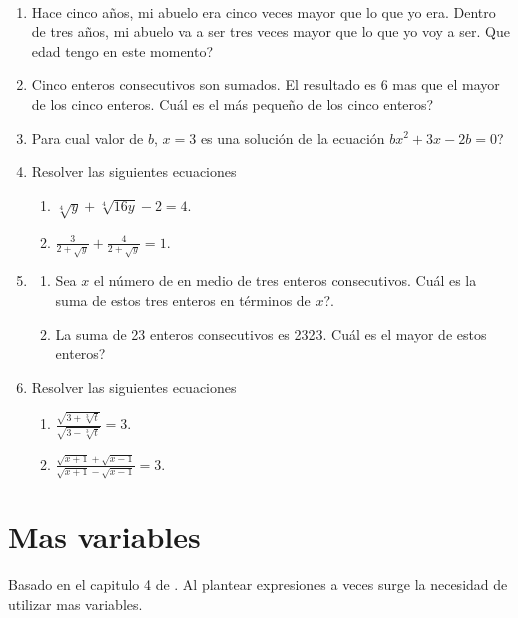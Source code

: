 \begin{exers}{\ \\}
\begin{enumerate}
\item Hace cinco años, mi abuelo era cinco veces mayor que lo que yo era. Dentro de tres años, mi abuelo va a ser tres veces mayor que lo que yo voy a ser. Que edad tengo en este momento?

\item Cinco enteros consecutivos son sumados. El resultado es 6 mas que el mayor de los cinco enteros. Cuál es el más pequeño de los cinco enteros?

\item Para cual valor de $b$, $x=3$ es una solución de la ecuación $bx^2+3x-2b=0$?

\item Resolver las siguientes ecuaciones	
		\begin{multicols}{2}
			\begin{enumerate}[label=\Alph*)]
				\item $\sqrt[4]{y} + \sqrt[4]{16y}-2=4$.
				\item $\frac{3}{2+\sqrt{y}} + \frac{4}{2+\sqrt{y}} = 1$.
			\end{enumerate}
		\end{multicols}
	
\item \hspace{1cm}	
	\begin{enumerate}[label=\Alph*)]
		\item Sea $x$ el número de en medio de tres enteros consecutivos. Cuál es la suma de estos tres enteros en términos de $x$?.
		\item La suma de 23 enteros consecutivos es 2323. Cuál es el mayor de estos enteros?
	\end{enumerate}

\item Resolver las siguientes ecuaciones	
		\begin{multicols}{2}
			\begin{enumerate}[label=\Alph*)]
				\item $\frac{\sqrt{3+\sqrt[3]{t}}}{\sqrt{3-\sqrt[3]{t}}} = 3$.
				\item $\frac{\sqrt{x+1}+\sqrt{x-1}}{\sqrt{x+1}-\sqrt{x-1}} = 3$.
			\end{enumerate}
		\end{multicols}
\end{enumerate}
\end{exers}
\newpage


\chapter{Mas variables}\label{Capitulo_mas_variables}
Basado en el capitulo 4 de \cite{Aops_algebra}. Al plantear expresiones a veces surge la necesidad de utilizar mas variables.

